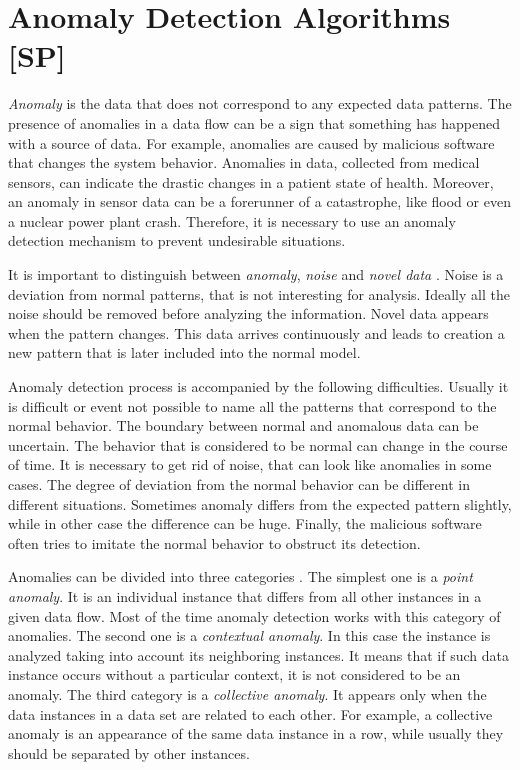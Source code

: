 \section{Anomaly Detection Algorithms [SP]}
\label{sec:anomaly_detection_algorithms}

\textit{Anomaly} is the data that does not correspond to any expected data patterns.
The presence of anomalies in a data flow can be a sign that something has happened with a source of data.
For example, anomalies are caused by malicious software that changes the system behavior. 
Anomalies in data, collected from medical sensors, can indicate the drastic changes in a patient state of health.
Moreover, an anomaly in sensor data can be a forerunner of a catastrophe, like flood or even a nuclear power plant crash.
Therefore, it is necessary to use an anomaly detection mechanism to prevent undesirable situations.

It is important to distinguish between \textit{anomaly}, \textit{noise} and \textit{novel data} \cite{Chandola2007}.
Noise is a deviation from normal patterns, that is not interesting for analysis.
Ideally all the noise should be removed before analyzing the information.
Novel data appears when the pattern changes.
This data arrives continuously and leads to creation a new pattern that is later included into the normal model.  

Anomaly detection process is accompanied by the following difficulties.
Usually it is difficult or event not possible to name all the patterns that correspond to the normal behavior.
The boundary between normal and anomalous data can be uncertain.
The behavior that is considered to be normal can change in the course of time.
It is necessary to get rid of noise, that can look like anomalies in some cases.
The degree of deviation from the normal behavior can be different in different situations.
Sometimes anomaly differs from the expected pattern slightly, while in other case the difference can be huge.
Finally, the malicious software often tries to imitate the normal behavior to obstruct its detection. 

Anomalies can be divided into three categories \cite{Chandola2007}.
The simplest one is a \textit{point anomaly}.
It is an individual instance that differs from all other instances in a given data flow.
Most of the time anomaly detection works with this category of anomalies.
The second one is a \textit{contextual anomaly}.
In this case the instance is analyzed taking into account its neighboring instances.
It means that if such data instance occurs without a particular context, it is not considered to be an anomaly.
The third category is a \textit{collective anomaly}.
It appears only when the data instances in a data set are related to each other.
For example, a collective anomaly is an appearance of the same data instance in a row, while usually they should be separated by other instances.

